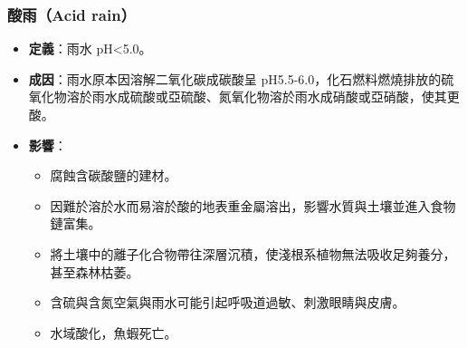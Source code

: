 \documentclass[a4paper,12pt]{report}
\begin{document}
\subsubsection{酸雨（Acid rain）}
\begin{itemize}
    \item \textbf{定義}：雨水 pH<5.0。
    \item \textbf{成因}：雨水原本因溶解二氧化碳成碳酸呈 pH5.5-6.0，化石燃料燃燒排放的硫氧化物溶於雨水成硫酸或亞硫酸、氮氧化物溶於雨水成硝酸或亞硝酸，使其更酸。
    \item \textbf{影響}：
    \begin{itemize}
        \item 腐蝕含碳酸鹽的建材。
        \item 因難於溶於水而易溶於酸的地表重金屬溶出，影響水質與土壤並進入食物鏈富集。
        \item 將土壤中的離子化合物帶往深層沉積，使淺根系植物無法吸收足夠養分，甚至森林枯萎。
        \item 含硫與含氮空氣與雨水可能引起呼吸道過敏、刺激眼睛與皮膚。
        \item 水域酸化，魚蝦死亡。
    \end{itemize}
\end{itemize}
\end{document}
